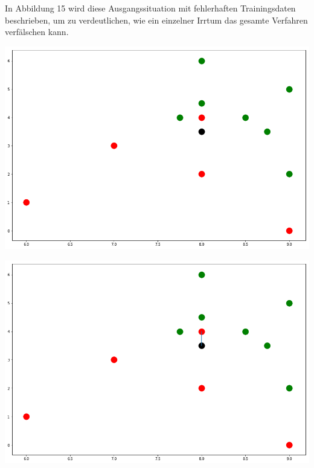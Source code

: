 \documentclass[fontsize=11pt]{scrartcl}
\newenvironment{Figure}
  {\par\medskip\noindent\minipage{\linewidth}}
  {\endminipage\par\medskip}
\begin{document}
                In Abbildung 15 wird diese Ausgangssituation mit fehlerhaften Trainingsdaten beschrieben, um zu verdeutlichen, wie ein einzelner Irrtum das gesamte Verfahren verfälschen kann. \par 
                \begin{Figure}
                    \begin{minipage}[b]{.4\linewidth}
                        \includegraphics[width=\linewidth]{errnn1.png}
                    \end{minipage}
                    \hspace*{.1\linewidth}
                    \begin{minipage}[b]{.4\linewidth}
                        \includegraphics[width=\linewidth]{errnn2.png}
                    \end{minipage}
                \end{Figure}
\end{document}
